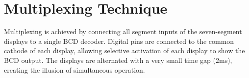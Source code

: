 \section{Multiplexing Technique}
Multiplexing is achieved by connecting all segment inputs of the seven-segment displays to a single BCD decoder. Digital pins are connected to the common cathode of each display, allowing selective activation of each display to show the BCD output. The displays are alternated with a very small time gap (2ms), creating the illusion of simultaneous operation.
